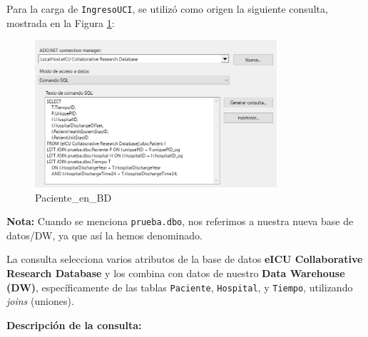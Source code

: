 \documentclass[12pt, a4paper, twoside]{article}
\begin{document}
	Para la carga de \texttt{IngresoUCI}, se utilizó como origen la siguiente consulta, mostrada en la Figura \ref{fig:26}:
	
	\begin{figure}[H]
		\centering
		\includegraphics[width=0.8\textwidth]{image/110_carga_ingreso_origen.png}
		\caption{Paciente\_en\_BD}
		\label{fig:26}
	\end{figure}
	
	\textbf{Nota:} Cuando se menciona \texttt{prueba.dbo}, nos referimos a nuestra nueva base de datos/DW, ya que así la hemos denominado.
	
	La consulta selecciona varios atributos de la base de datos \textbf{eICU Collaborative Research Database} y los combina con datos de nuestro \textbf{Data Warehouse (DW)}, específicamente de las tablas \texttt{Paciente}, \texttt{Hospital}, y \texttt{Tiempo}, utilizando \textit{joins} (uniones).
	
	\textbf{Descripción de la consulta:}
	
\end{document}
